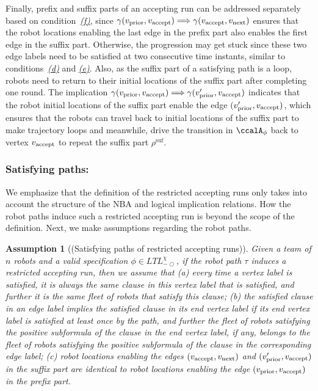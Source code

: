 \documentclass[Afour,sageh,times]{sagej}
\newtheorem{asmp}[thm]{Assumption}
\newcommand{\autop}{\ccalA_{\phi}}
\newcommand{\vertex}[1]{v_{\textup{#1}}}
\newcommand{\simplies}{\DOTSB\Longrightarrow}
\begin{document}
      Finally, prefix and suffix parts of an accepting run can be addressed separately based on condition~\hyperref[cond:f]{\it (f)}, since  $\gamma(\vertex{prior}, \vertex{accept}) \simplies  \gamma(\vertex{accept}, \vertex{next})$  ensures that the robot locations enabling the last edge in the prefix part also enables the first edge in the suffix part. Otherwise, the progression may get stuck since these two edge labels need to be satisfied at two consecutive time instants, similar to conditions~\hyperref[cond:d]{\it (d)} and \hyperref[cond:e]{\it (e)}. Also, as the suffix part of a satisfying path is a loop, robots need to return to their initial locations of the suffix part after completing one round. The implication $\gamma(\vertex{prior}, \vertex{accept}) \simplies  \gamma(\vertex{prior}', \vertex{accept})$ indicates that the robot initial locations of the suffix part enable the edge  $(\vertex{prior}', \vertex{accept})$, which ensures that the robots can travel back to initial locations of the suffix part to make trajectory loops and meanwhile, drive the transition in  $\autop$ back to  vertex $\vertex{accept}$ to repeat the suffix part $\rho^{\text{suf}}$.

      \subsubsection{Satisfying paths:}
We emphasize that the definition of the restricted  accepting runs only takes into account the structure of the  NBA and logical implication relations. How the robot paths induce such a restricted accepting run  is beyond the scope of the definition. Next, we make assumptions regarding the robot paths.
\begin{asmp}[(Satisfying paths of restricted accepting runs)]\label{asmp:same}
  Given a team of $n$ robots and a valid specification $\phi \in \textit{LTL}_{-\bigcirc}^\chi$, if the robot path $\tau$ induces a restricted accepting run, then we assume that  (a)\label{asmp:a} every time a vertex label is satisfied, it is always the same clause in this vertex label that is satisfied, and further it is the same fleet of robots that satisfy this clause; (b)\label{asmp:b} the satisfied clause in an edge label implies the satisfied clause in its end vertex label if its end vertex label is satisfied at least once by the path, and further the fleet of robots satisfying the positive subformula of the clause in the end vertex label, if any, belongs to the fleet of robots satisfying the positive  subformula of the clause in the corresponding edge label;
  (c)\label{asmp:c} robot locations  enabling the edges $(\vertex{accept}, \vertex{next})$ and  $(\vertex{prior}', \vertex{accept})$ in the suffix part are identical to robot locations enabling the  edge $(\vertex{prior}, \vertex{accept})$ in the prefix part.
\end{asmp}
\end{document}
